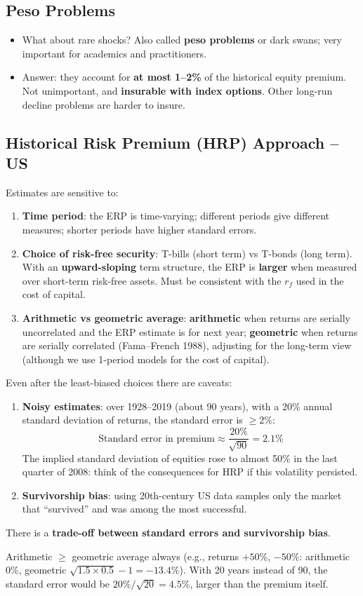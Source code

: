 \subsection{Peso Problems}
\begin{itemize}
  \item What about rare shocks? Also called \textbf{peso problems} or dark swans; very important for academics and practitioners.
  \item Answer: they account for \textbf{at most 1--2\%} of the historical equity premium. Not unimportant, and \textbf{insurable with index options}. Other long-run decline problems are harder to insure.
\end{itemize}

\subsection{Historical Risk Premium (HRP) Approach -- US}
Estimates are sensitive to:
\begin{enumerate}
  \item \textbf{Time period}: the ERP is time-varying; different periods give different measures; shorter periods have higher standard errors.
  \item \textbf{Choice of risk-free security}: T-bills (short term) vs T-bonds (long term). With an \textbf{upward-sloping} term structure, the ERP is \textbf{larger} when measured over short-term risk-free assets. Must be consistent with the $r_f$ used in the cost of capital.
  \item \textbf{Arithmetic vs geometric average}: \textbf{arithmetic} when returns are serially uncorrelated and the ERP estimate is for next year; \textbf{geometric} when returns are serially correlated (Fama--French 1988), adjusting for the long-term view (although we use 1-period models for the cost of capital).
\end{enumerate}
Even after the least-biased choices there are caveats:
\begin{enumerate}
  \item \textbf{Noisy estimates}: over 1928--2019 (about 90 years), with a 20\% annual standard deviation of returns, the standard error is $\geq2\%$:
  \[
  \text{Standard error in premium}\approx\frac{20\%}{\sqrt{90}}=2.1\%
  \]
  The implied standard deviation of equities rose to almost 50\% in the last quarter of 2008: think of the consequences for HRP if this volatility persisted.
  \item \textbf{Survivorship bias}: using 20th-century US data samples only the market that ``survived'' and was among the most successful.
\end{enumerate}
\begin{keybox}
There is a \textbf{trade-off between standard errors and survivorship bias}.
\end{keybox}
\begin{addbox}
Arithmetic $\geq$ geometric average always (e.g., returns $+50\%$, $-50\%$: arithmetic $0\%$, geometric $\sqrt{1.5\times0.5}-1=-13.4\%$). With 20 years instead of 90, the standard error would be $20\%/\sqrt{20}=4.5\%$, larger than the premium itself.
\end{addbox}


